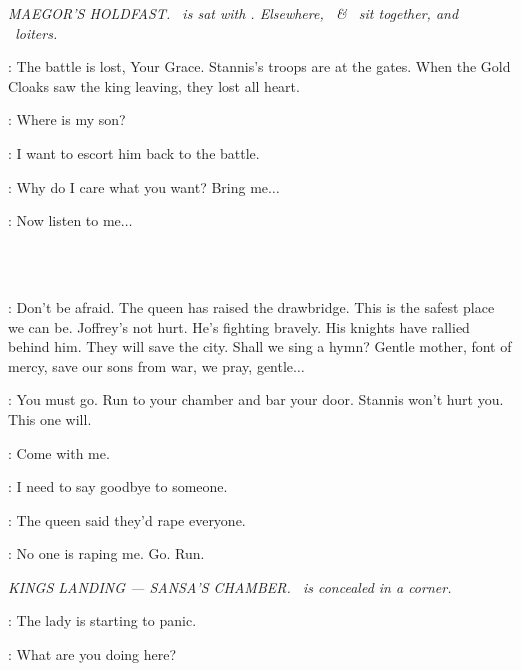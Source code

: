 
\scene

\textit{MAEGOR'S HOLDFAST. \CERSEI ~is sat
with \TOMMEN. Elsewhere, \SHAE ~\& \SANSA ~sit together, and \SERI
~loiters.}\\

\LANCEL: The battle is lost, Your Grace. 
Stannis's troops are at the gates. 
When the Gold Cloaks saw the king leaving, they lost all heart. 

\CERSEI: Where is my son? 

\LANCEL: I want to escort him back to the battle. 

\CERSEI: Why do I care what you want? Bring me$\ldots$  

\LANCEL: Now listen to me$\ldots$ 

\\
\\

\SANSA:  Don't be afraid. The queen has raised the drawbridge. 
This is the safest place we can be. 
Joffrey's not hurt. He's fighting bravely. 
His knights have rallied behind him. 
They will save the city. 
Shall we sing a hymn? 
 Gentle mother, font of mercy, save our sons from war, we pray, gentle$\ldots$ 

\SHAE:  You must go. 
Run to your chamber and bar your door. 
Stannis won't hurt you.  This one will. 

\SANSA: Come with me. 

\SHAE: I need to say goodbye to someone. 

\SANSA: The queen said they'd rape everyone. 

\SHAE:  No one is raping me. 
Go. Run. 

\scene

\textit{KINGS LANDING --- SANSA'S CHAMBER. \HOUND ~is concealed in a
corner.}\\

\HOUND: The lady is starting to panic. 

\SANSA:  What are you doing here? 

